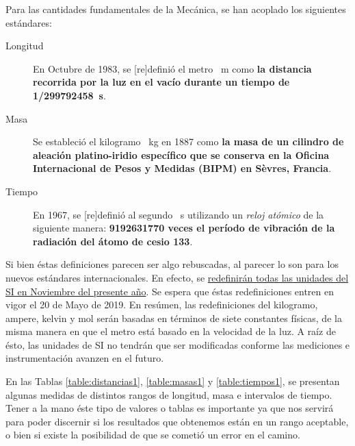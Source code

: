 Para las cantidades fundamentales de la Mec\'anica, se han acoplado los siguientes est\'andares:

\begin{description}
    \item [Longitud] En Octubre de 1983, se [re]defini\'o el metro \SI{}{\meter} como \textbf{la distancia recorrida por la luz en el vac\'io durante un tiempo de \SI{1/299792458}{\second}}.
    \item [Masa] Se estableci\'o el kilogramo \SI{}{\kilogram} en 1887 como \textbf{la masa de un cilindro de aleaci\'on platino-iridio espec\'ifico que se conserva en la Oficina Internacional de Pesos y Medidas (BIPM) en S\`evres, Francia}.
    \item [Tiempo] En 1967, se [re]defini\'o al segundo \SI{}{\second} utilizando un \emph{reloj at\'omico} de la siguiente manera: \textbf{\SI{9192631770}{} veces el per\'iodo de vibraci\'on de la radiaci\'on del \'atomo de cesio 133}.
\end{description}

Si bien \'estas definiciones parecen ser algo rebuscadas, al parecer lo son para los nuevos est\'andares internacionales. En efecto, se \href{https://www.bipm.org/utils/common/pdf/SI-statement.pdf}{redefinir\'an todas las unidades del SI en Noviembre del presente a\~no}. Se espera que \'estas redefiniciones entren en vigor el 20 de Mayo de 2019. En res\'umen, las redefiniciones del kilogramo, ampere, kelvin y mol ser\'an basadas en t\'erminos de siete constantes f\'isicas, de la misma manera en que el metro est\'a basado en la velocidad de la luz. A ra\'iz de \'esto, las unidades de SI no tendr\'an que ser modificadas conforme las mediciones e instrumentaci\'on avanzen en el futuro. 

En las Tablas \ref{table:distancias1}, \ref{table:masas1} y \ref{table:tiempos1}, se presentan algunas medidas de distintos rangos de longitud, masa e intervalos de tiempo. Tener a la mano \'este tipo de valores o tablas es importante ya que nos servir\'a para poder discernir si los resultados que obtenemos est\'an en un rango aceptable, o bien si existe la posibilidad de que se cometi\'o un error en el camino.

